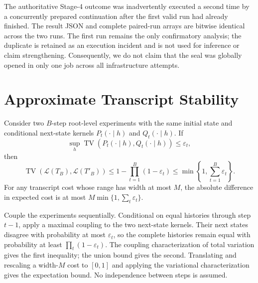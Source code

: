 The authoritative Stage-4 outcome was inadvertently executed a second time by a concurrently prepared continuation after the first valid run had already finished. The result JSON and complete paired-run arrays are bitwise identical across the two runs. The first run remains the only confirmatory analysis; the duplicate is retained as an execution incident and is not used for inference or claim strengthening. Consequently, we do not claim that the seal was globally opened in only one job across all infrastructure attempts.

\section{Approximate Transcript Stability}
\label{app:v21-stability}

\begin{proposition}
\label{prop:approximate-stability}
Consider two $B$-step root-level experiments with the same initial state and conditional next-state kernels $P_t(\cdot\mid h)$ and $Q_t(\cdot\mid h)$. If
\[
\sup_h \operatorname{TV}\!\left(P_t(\cdot\mid h),Q_t(\cdot\mid h)\right)\leq\varepsilon_t,
\]
then
\[
\operatorname{TV}\!\left(\mathcal L(T_B),\mathcal L(T'_B)\right)
\leq 1-\prod_{t=1}^B(1-\varepsilon_t)
\leq \min\!\left\{1,\sum_{t=1}^B\varepsilon_t\right\}.
\]
For any transcript cost whose range has width at most $M$, the absolute difference in expected cost is at most $M\min\{1,\sum_t\varepsilon_t\}$.
\end{proposition}

Couple the experiments sequentially. Conditional on equal histories through step $t-1$, apply a maximal coupling to the two next-state kernels. Their next states disagree with probability at most $\varepsilon_t$, so the complete histories remain equal with probability at least $\prod_t(1-\varepsilon_t)$. The coupling characterization of total variation gives the first inequality; the union bound gives the second. Translating and rescaling a width-$M$ cost to $[0,1]$ and applying the variational characterization gives the expectation bound. No independence between steps is assumed.
